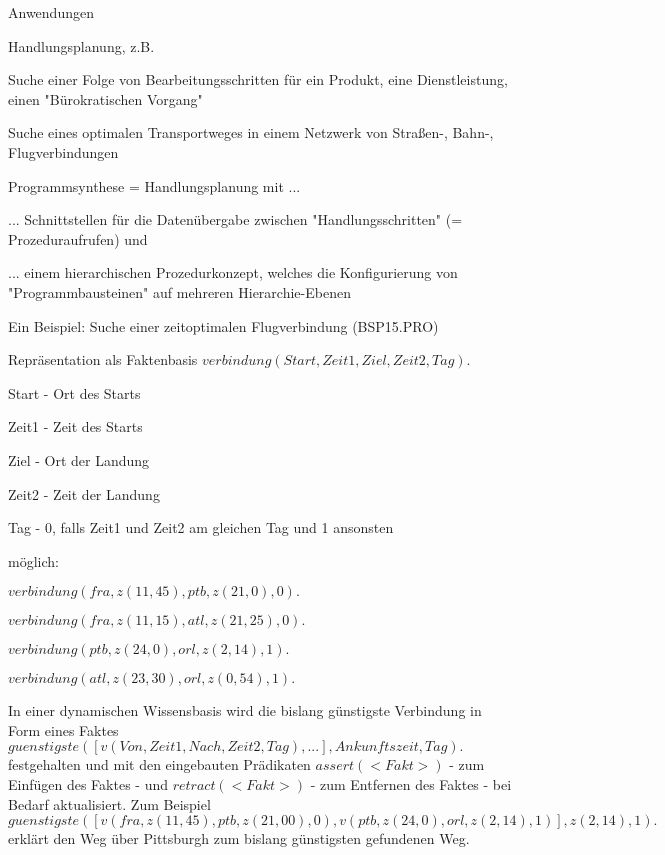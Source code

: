 \documentclass[a4paper]{article}
\begin{document}
\begin{multicols}{3}
  Anwendungen
  \begin{itemize*}
    \item Handlungsplanung, z.B.
    \begin{itemize*}
      \item Suche einer Folge von Bearbeitungsschritten für ein Produkt, eine Dienstleistung, einen "Bürokratischen Vorgang"
      \item Suche eines optimalen Transportweges in einem Netzwerk von Straßen-, Bahn-, Flugverbindungen
    \end{itemize*}
    \item Programmsynthese = Handlungsplanung mit ...
    \begin{itemize*}
      \item ... Schnittstellen für die Datenübergabe zwischen "Handlungsschritten" (= Prozeduraufrufen) und
      \item ... einem hierarchischen Prozedurkonzept, welches die Konfigurierung von "Programmbausteinen" auf mehreren Hierarchie-Ebenen
    \end{itemize*}
  \end{itemize*}

  Ein Beispiel: Suche einer zeitoptimalen Flugverbindung (BSP15.PRO)
  \begin{itemize*}
    \item Repräsentation als Faktenbasis $verbindung(Start,Zeit1,Ziel,Zeit2,Tag).$
    \item Start -  Ort des Starts
    \item Zeit1 - Zeit des Starts
    \item Ziel - Ort der Landung
    \item Zeit2 - Zeit der Landung
    \item Tag - 0, falls Zeit1 und Zeit2 am gleichen Tag und 1 ansonsten
    \item möglich:
    \begin{itemize*}
      \item $verbindung(fra,z(11,45),ptb,z(21,0),0).$
      \item $verbindung(fra,z(11,15),atl,z(21,25),0).$
      \item $verbindung(ptb,z(24,0),orl,z(2,14),1).$
      \item $verbindung(atl,z(23,30),orl,z(0,54),1).$
    \end{itemize*}
  \end{itemize*}

  In einer dynamischen Wissensbasis wird die bislang günstigste Verbindung in Form eines Faktes $guenstigste([ v(Von,Zeit1,Nach,Zeit2,Tag), ... ], Ankunftszeit, Tag ).$ festgehalten und mit den eingebauten Prädikaten $assert(<Fakt>)$ - zum Einfügen des Faktes - und $retract (<Fakt>)$ - zum Entfernen des Faktes - bei Bedarf aktualisiert.
  Zum Beispiel $guenstigste([v(fra,z(11,45),ptb,z(21,00),0),v(ptb,z(24,0),orl,z(2,14),1)],z(2,14),1).$ erklärt den Weg über Pittsburgh zum bislang günstigsten gefundenen Weg.


\end{multicols}
\end{document}

